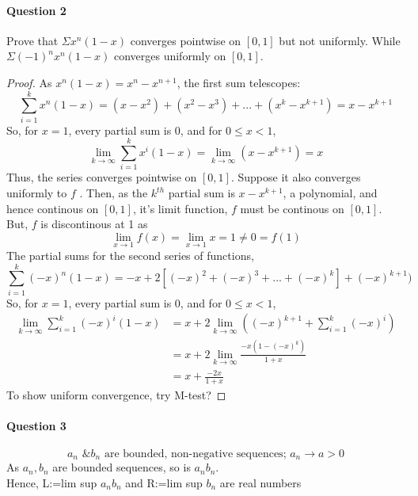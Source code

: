 \documentclass[20pt,a4paper]{extarticle} %
\begin{document}
\paragraph{Question 2}
Prove that $\Sigma x^n(1-x)$ converges pointwise on $[0,1]$ but not uniformly.
While $\Sigma (-1)^nx^n(1-x) $ converges uniformly on $[0,1]$.
\begin{proof}
	As $x^n(1-x) = x^n - x^{n+1}$, the first sum telescopes:
	\[\sum_{i=1}^k x^n(1-x) = (x - x^2) + (x^2 -x^3) +... + (x^k -x^{k+1}) = x- x^{k+1} \]
	So, for $x=1$, every partial sum is 0, and for $0\leq x <1$,
	\[ \lim_{k \to \infty } \sum_{i=1}^k x^i(1-x) = \lim_{k \to \infty }(x - x^{k+1})=x\]
	Thus, the series converges pointwise on $[0,1]$. Suppose it also converges uniformly to $f$ .
	Then, as the $k^{th}$ partial sum is $x-x^{k+1}$, a polynomial, and hence continous on $[0,1]$,
	it's limit function, $f$ must be continous on $[0,1]$. But, $f$ is discontinous at 1 as
	\[ \lim_{x \to 1} f(x) = \lim_{x \to 1} x = 1 \neq 0 = f(1) \]
	\pagebreak
	The partial sums for the second series of functions,
	\[\sum_{i=1}^k (-x)^n(1-x) = -x +2[(-x)^2 + (-x)^3 + ... + (-x)^k] + (-x)^{k+1})\]
	So, for $x=1$, every partial sum is 0, and for $0\leq x <1$,
	\begin{align*}
		\lim_{k \to \infty } \sum_{i=1}^k (-x)^i(1-x) &= x + 2\lim_{k \to \infty }((-x)^{k+1}+\sum_{i=1}^k (-x)^i ) \\
							      &=x + 2 \lim_{k \to \infty }\frac{-x(1-(-x)^k)}{1+x}\\
							      &=x+\frac{-2x}{1+x}
	\end{align*}
	To show uniform convergence, try M-test?

\end{proof}

\pagebreak

\paragraph{Question 3}
\[\text{ $a_n$ \& $b_n$ are bounded, non-negative sequences; $a_n \rightarrow a >0 $   } \]
As $a_n, b_n $ are bounded sequences, so is $a_n b_n$.\\
Hence, L:=lim sup $a_n b_n $ and R:=lim sup $b_n$ are real numbers
\end{document}
